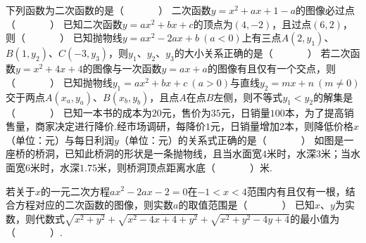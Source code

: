 \documentclass[10pt]{article}
\begin{document}
\showsecret
{}
\informationline
\begin{questions}{\selectingintroduction}
    \question 下列函数为二次函数的是（~~~~~~~）
    \question 二次函数$y = x^{2} + ax + 1 - a$的图像必过点（~~~~~~~）
    \question 已知二次函数$y = ax^{2} + bx + c$的顶点为$(4, - 2)$，且过点$(6,2)$，则（~~~~~~~）
    \question 已知抛物线$y=ax^2-2ax+b \ (a < 0)$上有三点$A(2,y_1)$、$B(1,y_2)$、$C(-3,y_3)$，则$y_1$、$y_2$、$y_3$的大小关系正确的是（~~~~~~~）
    \question 若二次函数$y = x^{2} + 4x + 4$的图像与一次函数$y = ax + a$的图像有且仅有一个交点，则（~~~~~~~）
    \question 已知抛物线$y_1=ax^2+bx+c \ (a > 0)$与直线$y_2=mx+n \ (m \neq 0)$交于两点$A(x_a,y_a)$、$B(x_b,y_b)$，且点$A$在点$B$左侧，则不等式$y_1<y_2$的解集是（~~~~~~~）
    \question 已知一本书的成本为$20$元，售价为$35$元，日销量$100$本，为了提高销售量，商家决定进行降价.经市场调研，每降价$1$元，日销量增加$2$本，则降低价格$x$（单位：元）与每日利润$y$（单位：元）的关系式正确的是（~~~~~~~）
    \question 如图是一座桥的桥洞，已知此桥洞的形状是一条抛物线，且当水面宽$4$米时，水深$3$米；当水面宽$6$米时，水深$1.75$米，则桥洞顶点距离水底（~~~~~~~）米.
    \begin{figure}[!htb]
        \raggedleft
    \end{figure}
    \question 若关于$x$的一元二次方程$ax^2-2ax-2=0$在$-1<x<4$范围内有且仅有一根，结合方程对应的二次函数的图像，则实数$a$的取值范围是（~~~~~~~）
    \question 已知$x$、$y$为实数，则代数式$\sqrt{x^2+y^2}+\sqrt{x^2-4x+4+y^2}+\sqrt{x^2+y^2-4y+4}$的最小值为（~~~~~~~）.
\end{questions}
\end{document}
